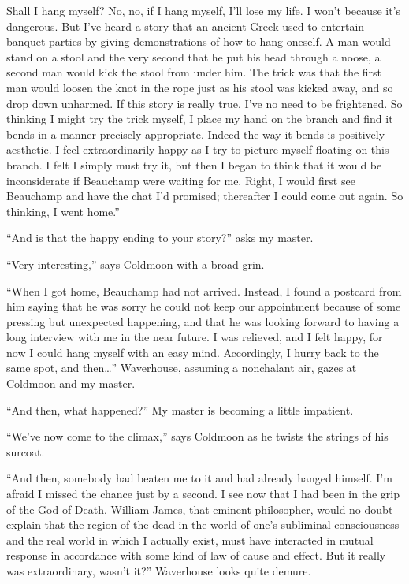 \documentclass[12pt, openright]{book}
\begin{document}
Shall I hang myself? No, no, if I hang myself, I'll lose my life. I
won't because it's dangerous. But I've heard a story that an ancient
Greek used to entertain banquet parties by giving demonstrations of how
to hang oneself. A man would stand on a stool and the very second that
he put his head through a noose, a second man would kick the stool from
under him. The trick was that the first man would loosen the knot in the
rope just as his stool was kicked away, and so drop down unharmed. If
this story is really true, I've no need to be frightened. So thinking I
might try the trick myself, I place my hand on the branch and find it
bends in a manner precisely appropriate. Indeed the way it bends is
positively aesthetic. I feel extraordinarily happy as I try to picture
myself floating on this branch. I felt I simply must try it, but then I
began to think that it would be inconsiderate if Beauchamp were waiting
for me. Right, I would first see Beauchamp and have the chat I'd
promised; thereafter I could come out again. So thinking, I went home.''

``And is that the happy ending to your story?'' asks my master.

``Very interesting,'' says Coldmoon with a broad grin.

``When I got home, Beauchamp had not arrived. Instead, I found a
postcard from him saying that he was sorry he could not keep our
appointment because of some pressing but unexpected happening, and that
he was looking forward to having a long interview with me in the near
future. I was relieved, and I felt happy, for now I could hang myself
with an easy mind. Accordingly, I hurry back to the same spot, and
then\ldots{}'' Waverhouse, assuming a nonchalant air, gazes at Coldmoon
and my master.

``And then, what happened?'' My master is becoming a little impatient.

``We've now come to the climax,'' says Coldmoon as he twists the strings
of his surcoat.

``And then, somebody had beaten me to it and had already hanged himself.
I'm afraid I missed the chance just by a second. I see now that I had
been in the grip of the God of Death. William James, that eminent
philosopher, would no doubt explain that the region of the dead in the
world of one's subliminal consciousness and the real world in which I
actually exist, must have interacted in mutual response in accordance
with some kind of law of cause and effect. But it really was
extraordinary, wasn't it?'' Waverhouse looks quite demure.
\end{document}
